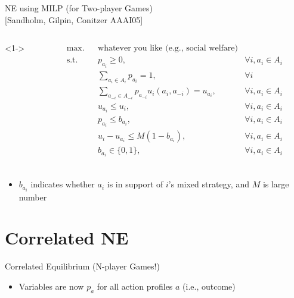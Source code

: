 \documentclass[11pt,aspectratio=169]{beamer}
\begin{document}
  \begin{frame}{NE using MILP (for Two-player Games) \\{\small [Sandholm, Gilpin, Conitzer AAAI05]
}}
   \begin{columns}<1->
    \begin{column}{0.7\textwidth}
    {\small
     $$
      \begin{aligned}
       & \text{max.}
       & & \text{whatever you like (e.g., social welfare)} & \\
       & \text{s.t.} & & p_{a_i} \ge 0, & \forall i, a_i \in A_i \\
       & & &\sum_{a_i \in A_i} p_{a_i} = 1, & \forall i \\
       & & & \sum_{a_{-i} \in A_{-i}}p_{a_{-i}}u_i(a_i,a_{-i}) = u_{a_i}, & \forall i, a_i \in A_i \\
       & & & u_{a_i} \le u_{i}, & \forall i, a_i \in A_i \\
       & & & p_{a_i} \le b_{a_i}, & \forall i, a_i \in A_i \\
       & & & u_i - u_{a_i} \le M (1 - b_{a_i}), & \forall i, a_i \in A_i \\
       & & & b_{a_i} \in \{0,1\}, & \forall i, a_i \in A_i \\
      \end{aligned}
     $$
    }
    \end{column}
   \end{columns}
   \vspace{0.5cm}
   \begin{itemize}
    \item<2-> $b_{a_i}$ indicates whether $a_i$ is in support of $i$'s mixed strategy, and $M$ is large number
   \end{itemize}
  \end{frame}

 \section{Correlated NE}
  \begin{frame}{Correlated Equilibrium (N-player Games!)}
   \begin{itemize}
    \item<1-> Variables are now $p_a$ for all action profiles $a$ (i.e., outcome)
   \end{itemize}
  \end{frame}
  
\end{document}
